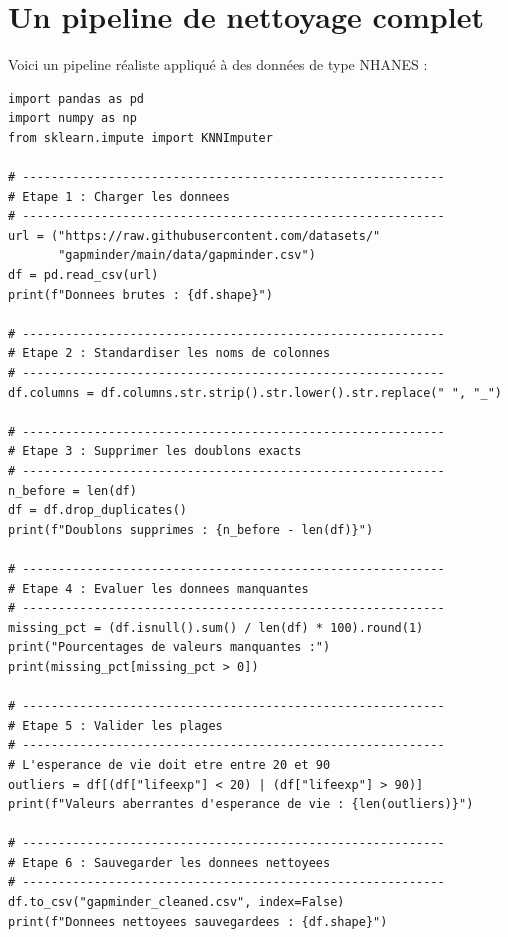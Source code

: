 \section{Un pipeline de nettoyage complet}

Voici un pipeline r\'ealiste appliqu\'e \`a des donn\'ees de type NHANES :

\begin{verbatim}
import pandas as pd
import numpy as np
from sklearn.impute import KNNImputer

# -----------------------------------------------------------
# Etape 1 : Charger les donnees
# -----------------------------------------------------------
url = ("https://raw.githubusercontent.com/datasets/"
       "gapminder/main/data/gapminder.csv")
df = pd.read_csv(url)
print(f"Donnees brutes : {df.shape}")

# -----------------------------------------------------------
# Etape 2 : Standardiser les noms de colonnes
# -----------------------------------------------------------
df.columns = df.columns.str.strip().str.lower().str.replace(" ", "_")

# -----------------------------------------------------------
# Etape 3 : Supprimer les doublons exacts
# -----------------------------------------------------------
n_before = len(df)
df = df.drop_duplicates()
print(f"Doublons supprimes : {n_before - len(df)}")

# -----------------------------------------------------------
# Etape 4 : Evaluer les donnees manquantes
# -----------------------------------------------------------
missing_pct = (df.isnull().sum() / len(df) * 100).round(1)
print("Pourcentages de valeurs manquantes :")
print(missing_pct[missing_pct > 0])

# -----------------------------------------------------------
# Etape 5 : Valider les plages
# -----------------------------------------------------------
# L'esperance de vie doit etre entre 20 et 90
outliers = df[(df["lifeexp"] < 20) | (df["lifeexp"] > 90)]
print(f"Valeurs aberrantes d'esperance de vie : {len(outliers)}")

# -----------------------------------------------------------
# Etape 6 : Sauvegarder les donnees nettoyees
# -----------------------------------------------------------
df.to_csv("gapminder_cleaned.csv", index=False)
print(f"Donnees nettoyees sauvegardees : {df.shape}")
\end{verbatim}

